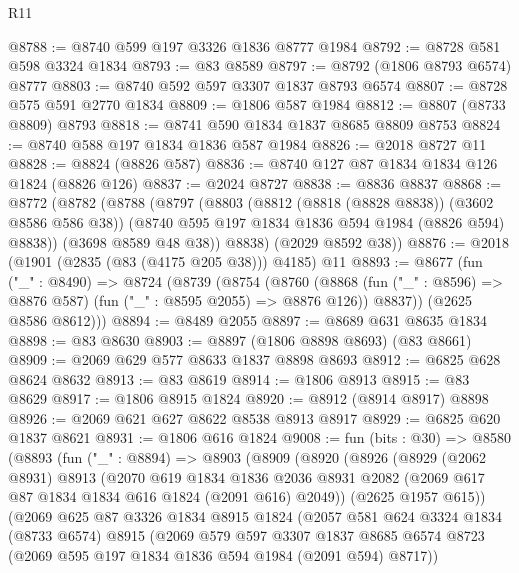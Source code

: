 \begin{lexlean}{R11}
\begin{coremodule}
@8788 := @8740 @599 @197 @3326 @1836 @8777 @1984
@8792 := @8728 @581 @598 @3324 @1834
@8793 := @83 @8589
@8797 := @8792 (@1806 @8793 @6574) @8777
@8803 := @8740 @592 @597 @3307 @1837 @8793 @6574
@8807 := @8728 @575 @591 @2770 @1834
@8809 := @1806 @587 @1984
@8812 := @8807 (@8733 @8809) @8793
@8818 := @8741 @590 @1834 @1837 @8685 @8809 @8753
@8824 := @8740 @588 @197 @1834 @1836 @587 @1984
@8826 := @2018 @8727 @11
@8828 := @8824 (@8826 @587)
@8836 := @8740 @127 @87 @1834 @1834 @126 @1824 (@8826 @126)
@8837 := @2024 @8727
@8838 := @8836 @8837
@8868 := @8772
    (@8782
      (@8788
        (@8797
          (@8803
            (@8812 (@8818 (@8828 @8838)) (@3602 @8586 @586 @38))
            (@8740 @595 @197 @1834 @1836 @594 @1984 (@8826 @594) @8838))
          (@3698 @8589 @48 @38))
        @8838)
      (@2029 @8592 @38))
@8876 := @2018 (@1901 (@2835 (@83 (@4175 @205 @38))) @4185) @11
@8893 := @8677
    (fun ("_" : @8490) =>
    @8724
      (@8739
        (@8754
          (@8760
            (@8868 (fun ("_" : @8596) => @8876 @587) (fun ("_" : @8595 @2055) => @8876 @126))
            @8837))
        (@2625 @8586 @8612)))
@8894 := @8489 @2055
@8897 := @8689 @631 @8635 @1834
@8898 := @83 @8630
@8903 := @8897 (@1806 @8898 @8693) (@83 @8661)
@8909 := @2069 @629 @577 @8633 @1837 @8898 @8693
@8912 := @6825 @628 @8624 @8632
@8913 := @83 @8619
@8914 := @1806 @8913
@8915 := @83 @8629
@8917 := @1806 @8915 @1824
@8920 := @8912 (@8914 @8917) @8898
@8926 := @2069 @621 @627 @8622 @8538 @8913 @8917
@8929 := @6825 @620 @1837 @8621
@8931 := @1806 @616 @1824
@9008 := fun (bits : @30) =>
  @8580
    (@8893
      (fun ("_" : @8894) =>
      @8903
        (@8909
          (@8920
            (@8926
              (@8929
                (@2062 @8931)
                @8913
                (@2070
                  @619
                  @1834
                  @1836
                  @2036
                  @8931
                  @2082
                  (@2069 @617 @87 @1834 @1834 @616 @1824 (@2091 @616) @2049))
                (@2625 @1957 @615))
              (@2069
                @625
                @87
                @3326
                @1834
                @8915
                @1824
                (@2057
                  @581
                  @624
                  @3324
                  @1834
                  (@8733 @6574)
                  @8915
                  (@2069
                    @579
                    @597
                    @3307
                    @1837
                    @8685
                    @6574
                    @8723
                    (@2069 @595 @197 @1834 @1836 @594 @1984 (@2091 @594) @8717))

\end{coremodule}
\end{lexlean}
